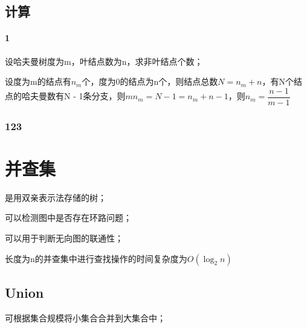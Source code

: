 \subsection{计算}

\paragraph{1}
设哈夫曼树度为m，叶结点数为n，求非叶结点个数；

设度为m的结点有\(n_m\)个，度为0的结点为n个，则结点总数\(N = n_m + n\)，有N个结点的哈夫曼数有N - 1条分支，则\(mn_m = N - 1 = n_m + n - 1\)，则\(n_m = \dfrac{n - 1}{m - 1}\)


\subsubsection{123}


\section{并查集}

是用双亲表示法存储的树；

可以检测图中是否存在环路问题；

可以用于判断无向图的联通性；

长度为n的并查集中进行查找操作的时间复杂度为\(O(\log_2n)\)

\subsection{Union}

可根据集合规模将小集合合并到大集合中；

